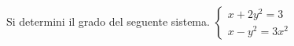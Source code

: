 Si determini il grado del seguente sistema.
$\displaystyle
\left\{
\begin{array}{l}
x + 2y^2 = 3 
\\
x-y^2 = 3x^2
\end{array}
\right. $
